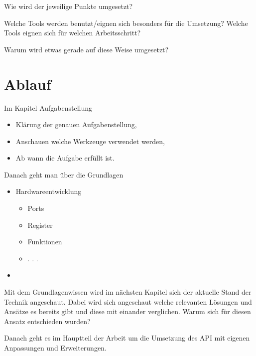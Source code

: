 Wie wird der jeweilige Punkte umgesetzt?

Welche Tools werden benutzt/eignen sich besonders für die Umsetzung?
Welche Tools eignen sich für welchen Arbeitsschritt?

Warum wird etwas gerade auf diese Weise umgesetzt?

\section{Ablauf}
Im Kapitel Aufgabenstellung
	\begin{itemize}
		\item Klärung der genauen Aufgabenstellung,
		\item Anschauen welche Werkzeuge verwendet werden,
		\item Ab wann die Aufgabe erfüllt ist.
	\end{itemize}
	
Danach geht man über die Grundlagen
	\begin{itemize}
		\item Hardwareentwicklung
		\begin{itemize}
			\item Ports
			\item Register
			\item Funktionen
			\item . . .
		\end{itemize}
		\item 
	\end{itemize}

Mit dem Grundlagenwissen wird im nächsten Kapitel sich der aktuelle Stand der Technik angeschaut.
Dabei wird sich angeschaut welche relevanten Lösungen und Ansätze es bereits gibt und diese mit einander verglichen.
Warum sich für diesen Ansatz entschieden wurden?

Danach geht es im Hauptteil der Arbeit um die Umsetzung des API mit eigenen Anpassungen und Erweiterungen.








